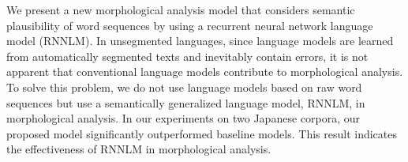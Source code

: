 We present a new morphological analysis model that considers semantic plausibility of word sequences by using a recurrent neural network language model (RNNLM). In unsegmented languages, since language models are learned from automatically segmented texts and inevitably contain errors, it is not apparent that conventional language models contribute to morphological analysis. To solve this problem, we do not use language models based on raw word sequences but use a semantically generalized language model, RNNLM, in morphological analysis. In our experiments on two Japanese corpora, our proposed model significantly outperformed baseline models. This result indicates the effectiveness of RNNLM in morphological analysis.
